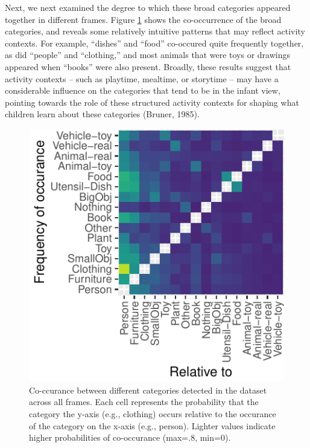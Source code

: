 \documentclass[10pt, letterpaper]{article}
\newenvironment{CodeChunk}{}{}
\begin{document}
Next, we next examined the degree to which these broad categories
appeared together in different frames. Figure \ref{fig:coocc_stats}
shows the co-occurrence of the broad categories, and reveals some
relatively intuitive patterns that may reflect activity contexts. For
example, ``dishes'' and ``food'' co-occured quite frequently together,
as did ``people'' and ``clothing,'' and most animals that were toys or
drawings appeared when ``books'' were also present. Broadly, these
results suggest that activity contexts -- such as playtime, mealtime, or
storytime -- may have a considerable influence on the categories that
tend to be in the infant view, pointing towards the role of these
structured activity contexts for shaping what children learn about these
categories (Bruner, 1985).

\begin{CodeChunk}
\begin{figure}[h]

{\centering \includegraphics{figs/coocc_stats-1} 

}

\caption[Co-ccurance between different categories detected in the dataset across all frames]{Co-ccurance between different categories detected in the dataset across all frames.  Each cell represents the probability that the category the y-axis (e.g., clothing) occurs relative to the occurance of the category on the x-axis (e.g., person). Lighter values indicate higher probabilities of co-occurance (max=.8, min=0).}\label{fig:coocc_stats}
\end{figure}
\end{CodeChunk}
\end{document}
